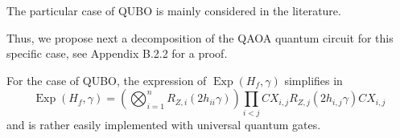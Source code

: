 The particular case of QUBO is mainly considered in the literature. 

Thus, we propose next a decomposition of the QAOA quantum circuit for this specific case, see Appendix B.2.2 for a proof.

\begin{proposition}
    For the case of QUBO, the expression of $\operatorname{Exp}\left(H_{f}, \gamma\right)$ simplifies in
\begin{equation}
    \operatorname{Exp}\left(H_{f}, \gamma\right)=\left(\bigotimes_{i=1}^{n} R_{Z, i}\left(2 h_{i i} \gamma\right)\right) \prod_{i<j} C X_{i, j} R_{Z, j}\left(2 h_{i, j} \gamma\right) C X_{i, j}
\end{equation}
and is rather easily implemented with universal quantum gates.
\end{proposition}

